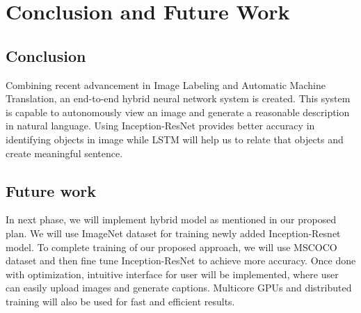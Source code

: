 \chapter{Conclusion and Future Work}\label{Conclusion and Future Work}
\section{Conclusion}

Combining recent advancement in Image Labeling and Automatic Machine Translation, an end-to-end hybrid neural network system is created. This system is capable to autonomously view an image and generate a reasonable description in natural language. Using Inception-ResNet provides better accuracy in identifying objects in image while LSTM will help us to relate that objects and create meaningful sentence.

\section{Future work}

In next phase, we will implement hybrid model as mentioned in our proposed plan. We will use ImageNet dataset for training newly added Inception-Resnet model. To complete training of our proposed approach, we will use MSCOCO dataset and then fine tune Inception-ResNet to achieve more accuracy. Once done with optimization, intuitive interface for user will be implemented, where user can easily upload images and generate captions. Multicore GPUs and distributed training will also be used for fast and efficient results.
